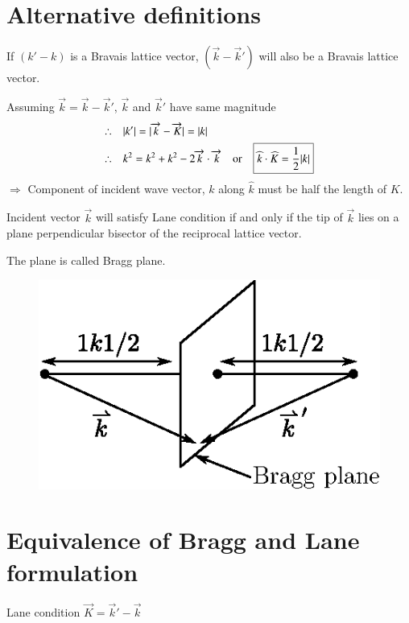 \section*{Alternative definitions}

If $(k'-k)$ is a Bravais lattice vector, $(\overrightarrow{k}-\overrightarrow{k}')$ will also be a Bravais lattice vector.

Assuming $\overrightarrow{k}=\overrightarrow{k}-\overrightarrow{k}'$, $\overrightarrow{k}$ and $\overrightarrow{k}'$ have same magnitude 
\begin{align*}
\therefore\quad & |k'|=|\overrightarrow{k}-\overrightarrow{K}|=|k|\\
\therefore\quad & k^{2}=k^{2}+k^{2}-2\overrightarrow{k}\cdot \overrightarrow{k}\quad \text{or}\quad \fbox{$\widehat{k}\cdot \widehat{K}=\dfrac{1}{2}|k|$}
\end{align*}
$\Rightarrow$ Component of incident wave vector, $k$ along $\widehat{k}$ must be half the length of $K$.

Incident vector $\overrightarrow{k}$ will satisfy Lane condition if and only if the tip of $\overrightarrow{k}$ lies on a plane perpendicular bisector of the reciprocal lattice vector.

The plane is called Bragg plane.
\begin{figure}[H]
\centering
\includegraphics{images/lecture14/fig5.eps}
\end{figure}

\section*{Equivalence of Bragg and Lane formulation}

Lane condition $\overrightarrow{K}=\overrightarrow{k}'-\overrightarrow{k}$

